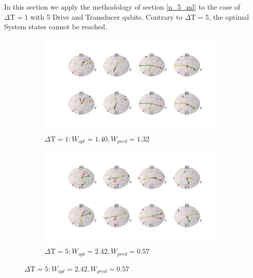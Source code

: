 In this section we apply the methodology of section \ref{n_5_ml} to the case of $\Delta \mathrm{T} = 1$ with 5 Drive and Transducer qubits.
Contrary to $\Delta \mathrm{T} = 5$, the optimal System states cannot be reached.


\begin{figure}
	\centering
	\begin{subfigure}{0.85\textwidth}
		\centering
		\includegraphics[width=\textwidth]{img/bloch_comp_1}
		\caption{$\Delta \mathrm{T} = 1: W_{opt} = 1.40, W_{pred} = 1.32$}
		\label{bloch_10553}
	\end{subfigure}
	\begin{subfigure}{0.85\textwidth}
		\centering
		\includegraphics[width=\textwidth]{img/bloch_comp_5}
		\caption{$\Delta \mathrm{T} = 5: W_{opt} = 2.42, W_{pred} = 0.57$}
		\label{bloch_worst}
	\end{subfigure}
\end{figure}